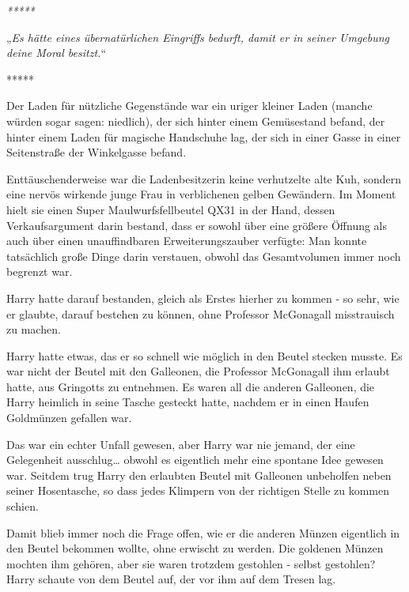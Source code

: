 

\hypertarget{der-fundamentale-attributionsfehler}{%

\emph{*****}

„\emph{Es hätte eines übernatürlichen Eingriffs bedurft, damit er in seiner Umgebung deine Moral besitzt.}“

*****

Der Laden für nützliche Gegenstände war ein uriger kleiner Laden (manche würden sogar sagen: niedlich), der sich hinter einem Gemüsestand befand, der hinter einem Laden für magische Handschuhe lag, der sich in einer Gasse in einer Seitenstraße der Winkelgasse befand.

Enttäuschenderweise war die Ladenbesitzerin keine verhutzelte alte Kuh, sondern eine nervös wirkende junge Frau in verblichenen gelben Gewändern. Im Moment hielt sie einen Super Maulwurfsfellbeutel QX31 in der Hand, dessen Verkaufsargument darin bestand, dass er sowohl über eine größere Öffnung als auch über einen unauffindbaren Erweiterungszauber verfügte: Man konnte tatsächlich große Dinge darin verstauen, obwohl das Gesamtvolumen immer noch begrenzt war.

Harry hatte darauf bestanden, gleich als Erstes hierher zu kommen - so sehr, wie er glaubte, darauf bestehen zu können, ohne Professor McGonagall misstrauisch zu machen.

Harry hatte etwas, das er so schnell wie möglich in den Beutel stecken musste. Es war nicht der Beutel mit den Galleonen, die Professor McGonagall ihm erlaubt hatte, aus Gringotts zu entnehmen. Es waren all die anderen Galleonen, die Harry heimlich in seine Tasche gesteckt hatte, nachdem er in einen Haufen Goldmünzen gefallen war.

Das war ein echter Unfall gewesen, aber Harry war nie jemand, der eine Gelegenheit ausschlug… obwohl es eigentlich mehr eine spontane Idee gewesen war. Seitdem trug Harry den erlaubten Beutel mit Galleonen unbeholfen neben seiner Hosentasche, so dass jedes Klimpern von der richtigen Stelle zu kommen schien.

Damit blieb immer noch die Frage offen, wie er die anderen Münzen eigentlich in den Beutel bekommen wollte, ohne erwischt zu werden. Die goldenen Münzen mochten ihm gehören, aber sie waren trotzdem gestohlen - selbst gestohlen? Harry schaute von dem Beutel auf, der vor ihm auf dem Tresen lag.

}
